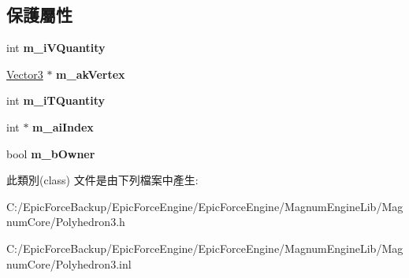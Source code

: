 \subsection*{保護屬性}
\begin{DoxyCompactItemize}
\item 
int {\bfseries m\+\_\+i\+V\+Quantity}\hypertarget{class_magnum_1_1_polyhedron3_aa923ba848c45a1814f713f51a6d543e7}{}\label{class_magnum_1_1_polyhedron3_aa923ba848c45a1814f713f51a6d543e7}

\item 
\hyperlink{class_magnum_1_1_vector3}{Vector3} $\ast$ {\bfseries m\+\_\+ak\+Vertex}\hypertarget{class_magnum_1_1_polyhedron3_a1e4316ef1e357ab29e16859ec471e7b4}{}\label{class_magnum_1_1_polyhedron3_a1e4316ef1e357ab29e16859ec471e7b4}

\item 
int {\bfseries m\+\_\+i\+T\+Quantity}\hypertarget{class_magnum_1_1_polyhedron3_aa851b8f07120d159efb9b0cc1447d634}{}\label{class_magnum_1_1_polyhedron3_aa851b8f07120d159efb9b0cc1447d634}

\item 
int $\ast$ {\bfseries m\+\_\+ai\+Index}\hypertarget{class_magnum_1_1_polyhedron3_a9509cdd92c35da8c5a45255132e33618}{}\label{class_magnum_1_1_polyhedron3_a9509cdd92c35da8c5a45255132e33618}

\item 
bool {\bfseries m\+\_\+b\+Owner}\hypertarget{class_magnum_1_1_polyhedron3_a5153d2f3cbc67fed2bb6e6b74ff21119}{}\label{class_magnum_1_1_polyhedron3_a5153d2f3cbc67fed2bb6e6b74ff21119}

\end{DoxyCompactItemize}


此類別(class) 文件是由下列檔案中產生\+:\begin{DoxyCompactItemize}
\item 
C\+:/\+Epic\+Force\+Backup/\+Epic\+Force\+Engine/\+Epic\+Force\+Engine/\+Magnum\+Engine\+Lib/\+Magnum\+Core/Polyhedron3.\+h\item 
C\+:/\+Epic\+Force\+Backup/\+Epic\+Force\+Engine/\+Epic\+Force\+Engine/\+Magnum\+Engine\+Lib/\+Magnum\+Core/Polyhedron3.\+inl\end{DoxyCompactItemize}
